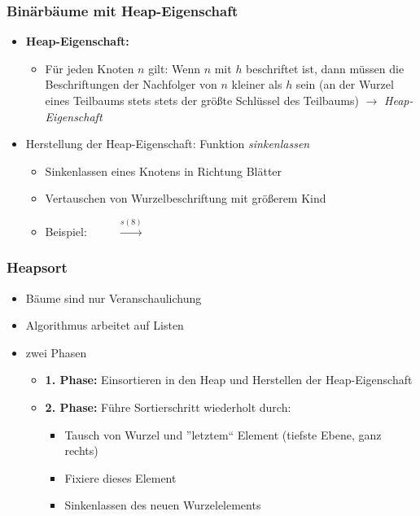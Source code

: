 \documentclass{beamer}
\begin{document}

\begin{frame} \frametitle{Binärbäume mit Heap-Eigenschaft}
	\small
	\begin{itemize}
		\item \textbf{Heap-Eigenschaft:}
		\begin{itemize}
			\item Für jeden Knoten $n$ gilt: Wenn $n$ mit $h$ beschriftet ist, dann müssen die Beschriftungen der Nachfolger von $n$ kleiner als $h$ sein (an der Wurzel eines Teilbaums stets stets der größte Schlüssel des Teilbaums) $\to$ \textit{Heap-Eigenschaft}
		\end{itemize}
		\item Herstellung der Heap-Eigenschaft: Funktion \textit{sinkenlassen}
		\begin{itemize}
			\item Sinkenlassen eines Knotens in Richtung Blätter
			\item Vertauschen von Wurzelbeschriftung mit größerem Kind
			\item Beispiel: $\qquad$ \fbox{\Tree [ .8 [ .9 ] [ .5 ] ]} $\overset{s(8)}{\longrightarrow}$ \fbox{\Tree [ .9 [ .8 ] [ .5 ]]}
		\end{itemize}
	\end{itemize}
\end{frame}

\begin{frame} \frametitle{Heapsort}
	\begin{itemize}
		\item Bäume sind nur Veranschaulichung
		\item Algorithmus arbeitet auf Listen
		\item zwei Phasen
		\begin{itemize}
			\item \textbf{1. Phase:} Einsortieren in den Heap und Herstellen der Heap-Eigenschaft
			\item \textbf{2. Phase:} Führe Sortierschritt wiederholt durch:
			\begin{itemize}
				\item Tausch von Wurzel und ''letztem`` Element (tiefste Ebene, ganz rechts)
				\item Fixiere dieses Element
				\item Sinkenlassen des neuen Wurzelelements
			\end{itemize}
		\end{itemize}
	\end{itemize}
\end{frame}
\end{document}
